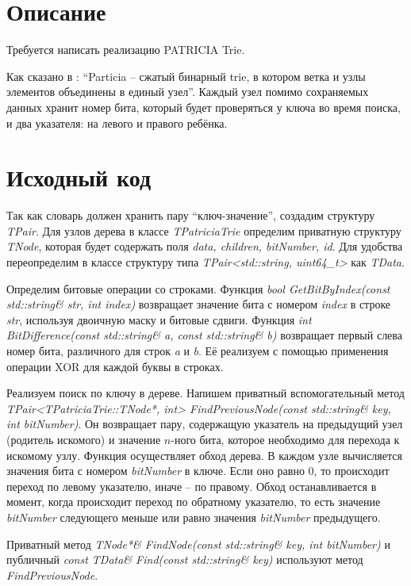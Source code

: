 \section{Описание}
Требуется написать реализацию PATRICIA Trie.

Как сказано в \cite{Mehta}: \enquote{Particia -- сжатый бинарный trie, в котором ветка и узлы элементов объединены в единый узел}.
Каждый узел помимо сохраняемых данных хранит номер бита, который будет проверяться у ключа во время поиска, и два указателя:
на левого и правого ребёнка.

\pagebreak

\section{Исходный код}
Так как словарь должен хранить пару \enquote{ключ-значение}, создадим структуру \textit{TPair}. Для узлов дерева в классе \textit{TPatriciaTrie}
определим приватную структуру \textit{TNode}, которая будет содержать поля \textit{data, children, bitNumber, id}.
Для удобства переопределим в классе структуру типа \textit{TPair<std::string, uint64\_t>} как \textit{TData}.

Определим битовые операции со строками. Функция \textit{bool GetBitByIndex(const std::string\& str, int index)} возвращает
значение бита с номером \textit{index} в строке \textit{str}, используя двоичную маску и битовые сдвиги.
Функция \textit{int BitDifference(const std::string\& a, const std::string\& b)} возвращает первый слева номер бита, различного
для строк \textit{a} и \textit{b}. Её реализуем с помощью применения операции XOR для каждой буквы в строках.

Реализуем поиск по ключу в дереве. Напишем приватный вспомогательный метод 
\textit{TPair<TPatriciaTrie::TNode*, int> FindPreviousNode(const std::string\& key, int bitNumber)}.
Он возвращает пару, содержащую указатель на предыдущий узел (родитель искомого) и значение $n$-ного бита, которое необходимо для перехода к 
искомому узлу. Функция осуществляет обход дерева. В каждом узле вычисляется значения бита с номером \textit{bitNumber} в ключе. Если оно 
равно 0, то происходит переход по левому указателю, иначе -- по правому. Обход останавливается в момент, когда происходит переход по 
обратному указателю, то есть значение \textit{bitNumber} следующего меньше или равно значения \textit{bitNumber} предыдущего.

Приватный метод \textit{TNode*\& FindNode(const std::string\& key, int bitNumber)} и публичный 
\textit{const TData\& Find(const std::string\& key)} используют метод \textit{FindPreviousNode}.

